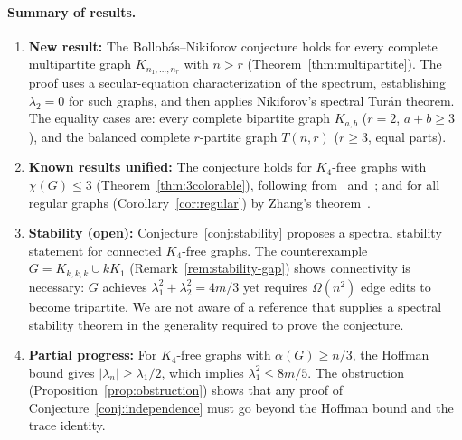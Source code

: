 \documentclass[preprint,12pt]{elsarticle}
\theoremstyle{plain}
\theoremstyle{definition}
\begin{document}
\paragraph{Summary of results.}
\begin{enumerate}
  \item \textbf{New result:} The Bollob\'as--Nikiforov conjecture holds for
        every complete multipartite graph $K_{n_1,\ldots,n_r}$ with $n > r$
        (Theorem~\ref{thm:multipartite}).
        The proof uses a secular-equation characterization of the spectrum,
        establishing $\lambda_2 = 0$ for such graphs, and then applies
        Nikiforov's spectral Tur\'an theorem.
        The equality cases are: every complete bipartite graph $K_{a,b}$
        ($r=2$, $a+b \geq 3$), and the balanced complete $r$-partite graph
        $T(n,r)$ ($r \geq 3$, equal parts).

  \item \textbf{Known results unified:} The conjecture holds for $K_4$-free
        graphs with $\chi(G) \leq 3$ (Theorem~\ref{thm:3colorable}),
        following from~\cite{LinNingWu2021} and~\cite{BollobasNikiforov2007};
        and for all regular graphs (Corollary~\ref{cor:regular}) by
        Zhang's theorem~\cite{ElphickWocjan2014}.

  \item \textbf{Stability (open):} Conjecture~\ref{conj:stability}
        proposes a spectral stability statement for connected $K_4$-free
        graphs.
        The counterexample $G = K_{k,k,k} \cup kK_1$
        (Remark~\ref{rem:stability-gap}) shows connectivity is necessary:
        $G$ achieves $\lambda_1^2 + \lambda_2^2 = 4m/3$ yet requires
        $\Omega(n^2)$ edge edits to become tripartite.
        We are not aware of a reference that supplies a spectral stability
        theorem in the generality required to prove the conjecture.

  \item \textbf{Partial progress:} For $K_4$-free graphs with
        $\alpha(G) \geq n/3$, the Hoffman bound gives
        $|\lambda_n| \geq \lambda_1/2$, which implies $\lambda_1^2 \leq 8m/5$.
        The obstruction (Proposition~\ref{prop:obstruction}) shows that
        any proof of Conjecture~\ref{conj:independence} must go beyond
        the Hoffman bound and the trace identity.
\end{enumerate}
\end{document}
